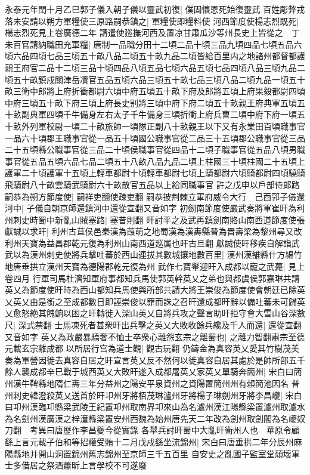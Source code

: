 永泰元年閏十月乙巳郭子儀入朝子儀以靈武初復|{
	僕固懷恩死始復靈武}
百姓彫弊戎落未安請以朔方軍糧使三原路嗣恭鎮之|{
	軍糧使即糧料使}
河西節度使楊志烈既死|{
	楊志烈死見上卷廣德二年}
請遣使廵撫河西及置凉甘肅瓜沙等州長史上皆從之　丁未百官請納職田充軍糧|{
	唐制一品職分田十二頃二品十頃三品九頃四品七頃五品六頃六品四頃七品三頃五十畝八品二頃五十畝九品二頃皆給百里内之地諸州都督都護親王府官二品十二頃三品十頃四品八頃五品七頃六品五頃七品四頃八品三頃九品二頃五十畝鎮戍關津岳凟官五品五頃六品三頃五十畝七品三頃八品二頃九品一頃五十畝三衛中郎將上府折衝都尉六頃中府五頃五十畝下府及郎將五頃上府果毅都尉四頃中府三頃五十畝下府三頃上府長史别將三頃中府下府二頃五十畝親王府典軍五頃五十畝副典軍四頃千牛備身左右太子千牛備身三頃折衝上府兵曹二頃中府下府一頃五十畝外列軍校尉一頃二十畝旅帥一頃隊正副八十畝親王以下又有永業田百頃職事官一品六十頃郡王職事官從一品五十頃國公職事官從二品三十五頃郡公職事官從三品二十五頃縣公職事官從三品二十頃侯職事官從四品十二頃子職事官從五品八頃男職事官從五品五頃六品七品二頃五十八畝八品九品二頃上柱國三十頃柱國二十五頃上護軍二十頃護軍十五頃上輕車都尉十頃輕車都尉七頃上騎都尉六頃騎都尉四頃驍騎飛騎尉八十畝雲騎武騎尉六十畝散官五品以上給同職事官}
許之戊申以戶部侍郎路嗣恭為朔方節度使|{
	嗣祥吏翻使疎吏翻}
嗣恭披荆棘立軍府威令大行　己酉郭子儀還河中|{
	子儀自朝京師還鎮河中還從宣翻又音如字}
初劒南節度使嚴武奏將軍崔旰為利州刺史時蜀中新亂山賊塞路|{
	塞昔則翻}
旰討平之及武再鎮劍南賂山南西道節度使張獻誠以求旰|{
	利州古苴侯邑秦漢為葭萌之地蜀漢為漢夀縣晉為晋壽梁為黎州尋又改利州天寶為益昌郡乾元復為利州山南西道廵属也旰古旦翻}
獻誠使旰移疾自解詣武武以為漢州刺史使將兵擊吐蕃於西山連拔其數城攘地數百里|{
	漢州漢雒縣什方綿竹地唐垂拱立漢州天寶為德陽郡乾元復為州}
武作七寶轝迎旰入成都以寵之武薨|{
	見上卷四月}
行軍司馬杜濟知軍府事都知兵馬使郭英幹英乂之弟也與都虞侯郭嘉琳共請英乂為節度使旰時為西山都知兵馬使與所部共請大將王崇俊為節度使會朝廷已除英乂英乂由是銜之至成都數日即誣崇俊以罪而誅之召旰還成都旰辭以備吐蕃未可歸英乂愈怒絶其餽餉以困之旰轉徙入深山英乂自將兵攻之聲言助旰拒守會大雪山谷深數尺|{
	深式禁翻}
士馬凍死者甚衆旰出兵擊之英乂大敗收餘兵纔及千人而還|{
	還從宣翻又音如字}
英乂為政嚴暴驕奢不恤士卒衆心離怨玄宗之離蜀也|{
	之離力智翻肅宗至德元載玄宗離成都}
以所居行宫為道士觀|{
	觀古玩翻}
仍鑄金為真容英乂愛其竹樹茂美奏為軍營因徙去真容自居之旰宣言英乂反不然何以徙真容自居其處於是帥所部五千餘人襲成都辛巳戰于城西英乂大敗旰遂入成都屠英乂家英乂單騎奔簡州|{
	宋白曰簡州漢牛鞞縣地隋仁夀三年分益州之陽安平泉資州之資陽置簡州州有賴簡池因名}
普州刺史韓澄殺英乂送首於旰卭州牙將栢茂琳瀘州牙將楊子琳劍州牙將李昌巙|{
	宋白曰卭州漢臨卭縣梁武陵王紀置卭州取南界卭來山為名瀘州漢江陽縣梁置瀘州取瀘水為名劍州漢廣漢之梓潼縣梁置安州西魏為始州唐先天二年改為劍州取劍閣為名巙奴刀翻　考異曰唐歷作李昌夔今從實錄}
各舉兵討旰蜀中大亂旰衛州人也　華原令顧繇上言元載子伯和等招權受賄十二月戊戍繇坐流錦州|{
	宋白曰唐垂拱二年分辰州麻陽縣地并開山洞置錦州舊志錦州至京師三千五百里}
自安史之亂國子監室堂頹壞軍士多借居之祭酒蕭昕上言學校不可遂廢


